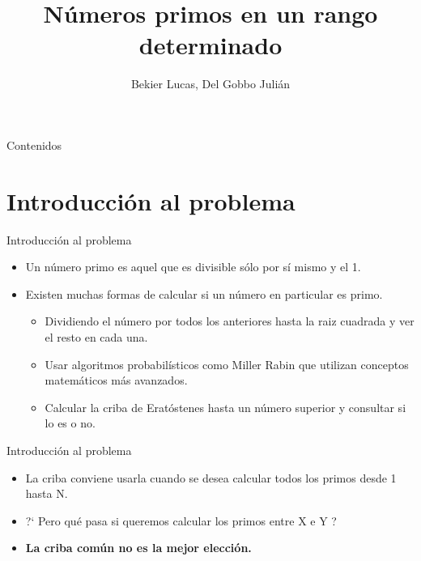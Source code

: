 \documentclass[compress]{beamer}
\title[Programación Paralela Basada en Patrones] %
{Números primos en un rango determinado}
\author[Bekier Lucas, Del Gobbo Julián] %
{Bekier Lucas, Del Gobbo Julián}
\institute[UBA FCEN] %
{
  Facultad de Ciencias Exactas y Naturales\\
  Universidad de Buenos Aires
}
\begin{document}
\begin{frame}
  \titlepage
\end{frame}

\begin{frame}{Contenidos}
  \tableofcontents
\end{frame}



\section{Introducci\'on al problema}

\begin{frame}{Introducci\'on al problema}

  \begin{itemize}
    \setlength\itemsep{1em}
    \item<1-> Un número primo es aquel que es divisible sólo por sí mismo y el 1.
    \item<2-> Existen muchas formas de calcular si un número en particular es primo.
  	\begin{itemize}
  	\setlength\itemsep{1em}
  		\item<3-> Dividiendo el número por todos los anteriores hasta la raiz cuadrada y ver el resto en cada una.
      \item<4-> Usar algoritmos probabilísticos como Miller Rabin que utilizan conceptos matemáticos más avanzados.
      \item<5-> Calcular la criba de Eratóstenes hasta un número superior y consultar si lo es o no.
  	\end{itemize} 
  \end{itemize}
\end{frame}


\begin{frame}{Introducci\'on al problema}
  \begin{itemize}
    \setlength\itemsep{1em}
    \item<1-> La criba conviene usarla cuando se desea calcular todos los primos desde 1 hasta N.
    \item<2-> ?` Pero qué pasa si queremos calcular los primos entre X e Y ?
    \item<3-> \textbf{La criba común no es la mejor elección.}
  \end{itemize}
\end{frame}
\end{document}
